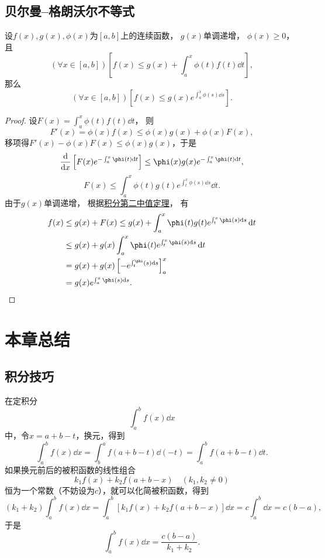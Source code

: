 \subsection{贝尔曼--格朗沃尔不等式}
\begin{theorem}\label{theorem:定积分.贝尔曼--格朗沃尔不等式}
设\(f(x),g(x),\phi(x)\)为\([a,b]\)上的连续函数，
\(g(x)\)单调递增，
\(\phi(x)\geq0\)，
且\[
	(\forall x \in [a,b])
	\left[
		f(x) \leq g(x) + \int_a^x \phi(t) f(t) \dd{t}
	\right],
\]
那么\[
	(\forall x \in [a,b])
	\left[
		f(x) \leq g(x) e^{\int_a^x \phi(s) \dd{s}}
	\right].
\]
\begin{proof}
设\(F(x) = \int_a^x \phi(t) f(t) \dd{t}\)，
则\[
	F'(x) = \phi(x) f(x) \leq \phi(x) g(x) + \phi(x) F(x),
\]
移项得\(F'(x) - \phi(x) F(x) \leq \phi(x) g(x)\)，于是\[
	\dv{x}\left[F(x) e^{-\int_a^x \phi(t) \dd{t}}\right]
	\leq \phi(x) g(x) e^{-\int_a^x \phi(t) \dd{t}},
\]\[
	F(x) \leq \int_a^x \phi(t) g(t) e^{\int_t^x \phi(s) \dd{s}} \dd{t}.
\]
由于\(g(x)\)单调递增，
根据\hyperref[theorem:定积分.积分中值定理2]{积分第二中值定理}，
有\begin{align*}
	f(x) &\leq g(x) + F(x)
		\leq g(x) + \int_a^x \phi(t) g(t) e^{\int_t^x \phi(s) \dd{s}} \dd{t} \\
	&\leq g(x) + g(x) \int_a^x \phi(t) e^{\int_t^x \phi(s) \dd{s}} \dd{t} \\
	&= g(x) + g(x) \left[-e^{\int_t^ \phi(s) \dd{s}}\right]_a^x \\
	&= g(x) e^{\int_a^x \phi(s) \dd{s}}.
	\qedhere
\end{align*}
\end{proof}
\end{theorem}

\section{本章总结}
\subsection{积分技巧}

在定积分\[
\int_a^b f(x) \dd{x}
\]中，令\(x=a+b-t\)，换元，得到\[
\int_a^b f(x) \dd{x}
= \int_b^a f(a+b-t) \dd(-t)
= \int_a^b f(a+b-t) \dd{t}.
\]如果换元前后的被积函数的线性组合\[
k_1 f(x) + k_2 f(a+b-x) \quad(k_1,k_2\neq0)
\]恒为一个常数（不妨设为\(c\)），就可以化简被积函数，得到\[
(k_1 + k_2) \int_a^b f(x) \dd{x}
= \int_a^b [k_1 f(x) + k_2 f(a+b-x)] \dd{x}
= c \int_a^b \dd{x} = c(b-a),
\]于是\[
\int_a^b f(x) \dd{x}
= \frac{c(b-a)}{k_1 + k_2}.
\]

